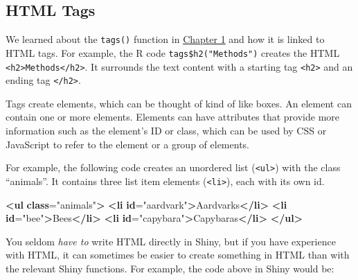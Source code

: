 \documentclass[
]{book}
\newenvironment{Shaded}{\begin{snugshade}}{\end{snugshade}}
\newcommand{\AttributeTok}[1]{\textcolor[rgb]{0.77,0.63,0.00}{#1}}
\newcommand{\ErrorTok}[1]{\textcolor[rgb]{0.64,0.00,0.00}{\textbf{#1}}}
\newcommand{\FunctionTok}[1]{\textcolor[rgb]{0.00,0.00,0.00}{#1}}
\newcommand{\KeywordTok}[1]{\textcolor[rgb]{0.13,0.29,0.53}{\textbf{#1}}}
\newcommand{\NormalTok}[1]{#1}
\newcommand{\OtherTok}[1]{\textcolor[rgb]{0.56,0.35,0.01}{#1}}
\newcommand{\SpecialCharTok}[1]{\textcolor[rgb]{0.00,0.00,0.00}{#1}}
\newcommand{\StringTok}[1]{\textcolor[rgb]{0.31,0.60,0.02}{#1}}
\begin{document}
\hypertarget{html-tags}{%
\subsection{HTML Tags}\label{html-tags}}

We learned about the \texttt{tags()} function in \protect\hyperlink{tags}{Chapter 1} and how it is linked to HTML tags. For example, the R code \texttt{tags\$h2("Methods")} creates the HTML \texttt{\textless{}h2\textgreater{}Methods\textless{}/h2\textgreater{}}. It surrounds the text content with a starting tag \texttt{\textless{}h2\textgreater{}} and an ending tag \texttt{\textless{}/h2\textgreater{}}.

Tags create elements, which can be thought of kind of like boxes. An element can contain one or more elements. Elements can have attributes that provide more information such as the element's ID or class, which can be used by CSS or JavaScript to refer to the element or a group of elements.

For example, the following code creates an unordered list (\texttt{\textless{}ul\textgreater{}}) with the class ``animals''. It contains three list item elements (\texttt{\textless{}li\textgreater{}}), each with its own id.

\begin{Shaded}
\begin{Highlighting}[]
\KeywordTok{\textless{}ul} \ErrorTok{class}\OtherTok{=}\StringTok{"animals"}\KeywordTok{\textgreater{}}
    \KeywordTok{\textless{}li} \ErrorTok{id}\OtherTok{=}\StringTok{"aardvark"}\KeywordTok{\textgreater{}}\NormalTok{Aardvarks}\KeywordTok{\textless{}/li\textgreater{}}
    \KeywordTok{\textless{}li} \ErrorTok{id}\OtherTok{=}\StringTok{"bee"}\KeywordTok{\textgreater{}}\NormalTok{Bees}\KeywordTok{\textless{}/li\textgreater{}}
    \KeywordTok{\textless{}li} \ErrorTok{id}\OtherTok{=}\StringTok{"capybara"}\KeywordTok{\textgreater{}}\NormalTok{Capybaras}\KeywordTok{\textless{}/li\textgreater{}}
\KeywordTok{\textless{}/ul\textgreater{}}
\end{Highlighting}
\end{Shaded}

You seldom \emph{have to} write HTML directly in Shiny, but if you have experience with HTML, it can sometimes be easier to create something in HTML than with the relevant Shiny functions. For example, the code above in Shiny would be:

\begin{Shaded}
\end{Shaded}
\end{document}

